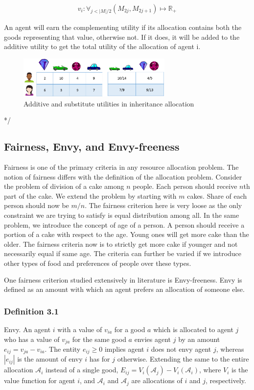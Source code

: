 \begin{gather}
    v_i: \forall_{j < |M|/2} (M_{2j}, M_{2j+1})\mapsto \mathbb{R_+}
\end{gather}

An agent will earn the complementing utility if its allocation contains both the goods representing that value, otherwise not. If it does, it will be added to the additive utility to get the total utility of the allocation of agent i.

\begin{figure}
\includegraphics[width=3in]{images/substitute_values.png}
\caption{Additive and substitute utilities in inheritance allocation}
\end{figure}

*/

\subsection{Fairness, Envy, and Envy-freeness}
\label{section_envy}
Fairness is one of the primary criteria in any resource allocation problem. The notion of fairness differs with the definition of the allocation problem. Consider the problem of division of a cake among $n$ people. Each person should receive $n$th part of the cake. We extend the problem by starting with $m$ cakes. Share of each person should now be $m/n$. The fairness criterion here is very loose as the only constraint we are trying to satisfy is equal distribution among all. In the same problem, we introduce the concept of age of a person. A person should receive a portion of a cake with respect to the age. Young ones will get more cake than the older. The fairness criteria now is to strictly get more cake if younger and not necessarily equal if same age. The criteria can further be varied if we introduce other types of food and preferences of people over these types.

One fairness criterion studied extensively in literature is Envy-freeness. Envy is defined as an amount with which an agent prefers an allocation of someone else. 

\subsubsection{Definition 3.1} Envy.
An agent $i$ with a value of $v_{ia}$ for a good $a$ which is allocated to agent $j$ who has a value of $v_{ja}$ for the same good $a$ envies agent $j$ by an
amount $e_{ij} = v_{ja} - v_{ia}$. The entity $e_{ij} \geq 0$ implies agent $i$ does not envy agent $j$, whereas $|e_{ij}|$ is the amount of envy $i$ has for $j$ otherwise. Extending the same to the entire allocation $\mathcal{A}_i$ instead of a single good, $E_{ij} = V_i(\mathcal{A}_j) - V_i(\mathcal{A}_i)$, where $V_i$ is the value function for agent $i$, and $\mathcal{A}_i$ and $\mathcal{A}_j$ are allocations of $i$ and $j$, respectively.

